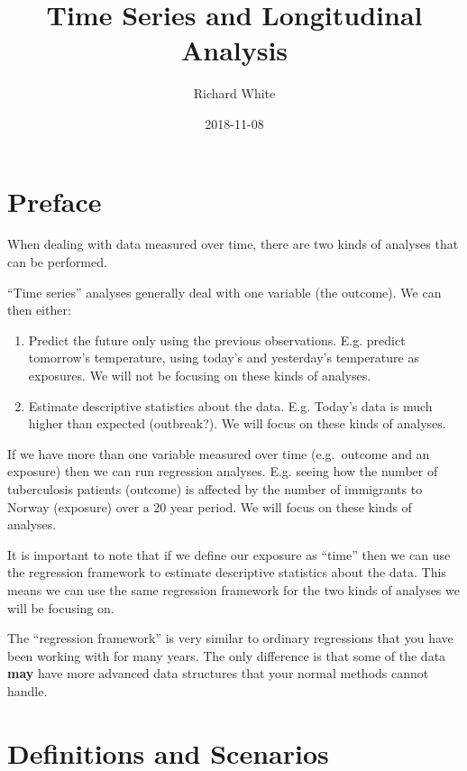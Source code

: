 \documentclass[]{book}
\title{Time Series and Longitudinal Analysis}
\author{Richard White}
\date{2018-11-08}
\providecommand{\tightlist}{%
  \setlength{\itemsep}{0pt}\setlength{\parskip}{0pt}}
\begin{document}
\maketitle

{
\setcounter{tocdepth}{1}
\tableofcontents
}
\chapter*{Preface}\label{preface}

When dealing with data measured over time, there are two kinds of
analyses that can be performed.

``Time series'' analyses generally deal with one variable (the outcome).
We can then either:

\begin{enumerate}
\def\labelenumi{\arabic{enumi}.}
\tightlist
\item
  Predict the future only using the previous observations. E.g. predict
  tomorrow's temperature, using today's and yesterday's temperature as
  exposures. We will not be focusing on these kinds of analyses.
\item
  Estimate descriptive statistics about the data. E.g. Today's data is
  much higher than expected (outbreak?). We will focus on these kinds of
  analyses.
\end{enumerate}

If we have more than one variable measured over time (e.g.~outcome and
an exposure) then we can run regression analyses. E.g. seeing how the
number of tuberculosis patients (outcome) is affected by the number of
immigrants to Norway (exposure) over a 20 year period. We will focus on
these kinds of analyses.

It is important to note that if we define our exposure as ``time'' then
we can use the regression framework to estimate descriptive statistics
about the data. This means we can use the same regression framework for
the two kinds of analyses we will be focusing on.

The ``regression framework'' is very similar to ordinary regressions
that you have been working with for many years. The only difference is
that some of the data \textbf{may} have more advanced data structures
that your normal methods cannot handle.

\chapter{Definitions and Scenarios}\label{definitions-and-scenarios}
\end{document}

